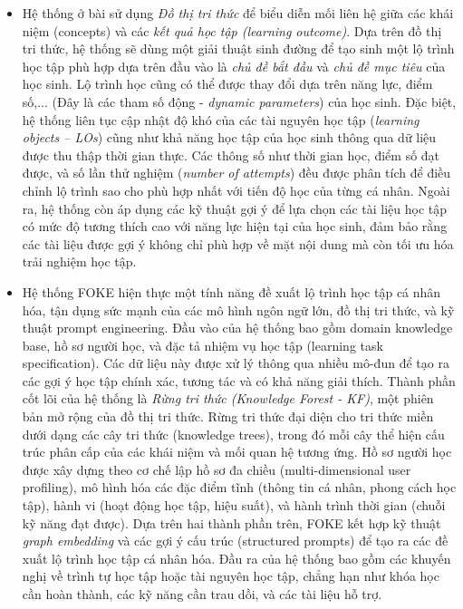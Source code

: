 \begin{itemize}
    \item Hệ thống ở bài \cite{Raj2022} sử dụng \emph{Đồ thị tri thức} để biểu diễn mối liên hệ giữa các khái niệm (concepts) và các \emph{kết quả học tập (learning outcome)}. Dựa trên đồ thị tri thức, hệ thống sẽ dùng một giải thuật sinh đường để tạo sinh một lộ trình học tập phù hợp dựa trên đầu vào là \emph{chủ đề bắt đầu} và \emph{chủ đề mục tiêu} của học sinh. Lộ trình học cũng có thể được thay đổi dựa trên năng lực, điểm số,... (Đây là các tham số động - \emph{dynamic parameters}) của học sinh. Đặc biệt, hệ thống liên tục cập nhật độ khó của các tài nguyên học tập (\emph{learning objects – LOs}) cũng như khả năng học tập của học sinh thông qua dữ liệu được thu thập thời gian thực. Các thông số như thời gian học, điểm số đạt được, và số lần thử nghiệm (\emph{number of attempts}) đều được phân tích để điều chỉnh lộ trình sao cho phù hợp nhất với tiến độ học của từng cá nhân. Ngoài ra, hệ thống còn áp dụng các kỹ thuật gợi ý để lựa chọn các tài liệu học tập có mức độ tương thích cao với năng lực hiện tại của học sinh, đảm bảo rằng các tài liệu được gợi ý không chỉ phù hợp về mặt nội dung mà còn tối ưu hóa trải nghiệm học tập.
    \item Hệ thống FOKE \cite{hu2024fokepersonalizedexplainableeducation} hiện thực một tính năng đề xuất lộ trình học tập cá nhân hóa, tận dụng sức mạnh của các mô hình ngôn ngữ lớn, đồ thị tri thức, và kỹ thuật prompt engineering. Đầu vào của hệ thống bao gồm domain knowledge base, hồ sơ người học, và đặc tả nhiệm vụ học tập (learning task specification). Các dữ liệu này được xử lý thông qua nhiều mô-đun để tạo ra các gợi ý học tập chính xác, tương tác và có khả năng giải thích. Thành phần cốt lõi của hệ thống là \emph{Rừng tri thức (Knowledge Forest - KF)}, một phiên bản mở rộng của đồ thị tri thức. Rừng tri thức đại diện cho tri thức miền dưới dạng các cây tri thức (knowledge trees), trong đó mỗi cây thể hiện cấu trúc phân cấp của các khái niệm và mối quan hệ tương ứng. Hồ sơ người học được xây dựng theo cơ chế lập hồ sơ đa chiều (multi-dimensional user profiling), mô hình hóa các đặc điểm tĩnh (thông tin cá nhân, phong cách học tập), hành vi (hoạt động học tập, hiệu suất), và hành trình thời gian (chuỗi kỹ năng đạt được). Dựa trên hai thành phần trên, FOKE kết hợp kỹ thuật \emph{graph embedding} và các gợi ý cấu trúc (structured prompts) để tạo ra các đề xuất lộ trình học tập cá nhân hóa. Đầu ra của hệ thống bao gồm các khuyến nghị về trình tự học tập hoặc tài nguyên học tập, chẳng hạn như khóa học cần hoàn thành, các kỹ năng cần trau dồi, và các tài liệu hỗ trợ.

\end{itemize}
